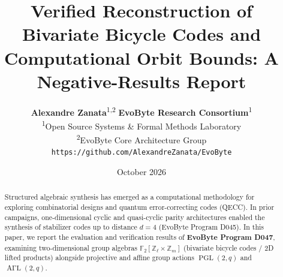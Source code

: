 \documentclass[11pt,a4paper]{article}
\title{\textbf{Verified Reconstruction of Bivariate Bicycle Codes and Computational Orbit Bounds: A Negative-Results Report}}
\author{
  \textbf{Alexandre Zanata}\textsuperscript{1,2} \quad \textbf{EvoByte Research Consortium}\textsuperscript{1} \\
  \textsuperscript{1}Open Source Systems \& Formal Methods Laboratory \\
  \textsuperscript{2}EvoByte Core Architecture Group \\
  \texttt{https://github.com/AlexandreZanata/EvoByte}
}
\date{October 2026}
\begin{document}
\maketitle

\begin{abstract}
Structured algebraic synthesis has emerged as a computational methodology for exploring combinatorial designs and quantum error-correcting codes (QECC). In prior campaigns, one-dimensional cyclic and quasi-cyclic parity architectures enabled the synthesis of stabilizer codes up to distance $d=4$ (EvoByte Program D045). In this paper, we report the evaluation and verification results of \textbf{EvoByte Program D047}, examining two-dimensional group algebras $\mathbb{F}_2[\mathbb{Z}_\ell \times \mathbb{Z}_m]$ (bivariate bicycle codes / 2D lifted products) alongside projective and affine group actions $\operatorname{PGL}(2, q)$ and $\operatorname{A\Gamma L}(2, q)$.


\end{abstract}
\end{document}
